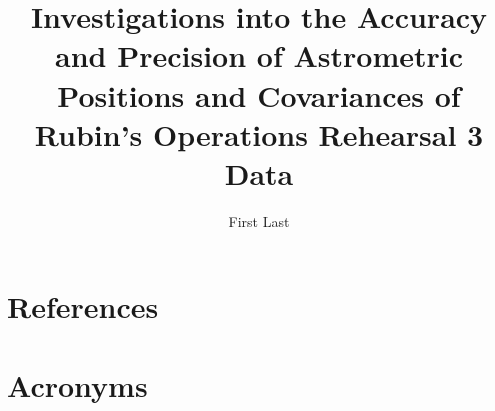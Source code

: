 \documentclass[SE,lsstdraft,authoryear,toc]{lsstdoc}
\title{Investigations into the Accuracy and Precision of Astrometric Positions and Covariances of Rubin's Operations Rehearsal 3 Data}
\author{%
First Last
}
\date{\vcsDate}
\begin{document}
\maketitle


\appendix
\section{References} \label{sec:bib}
\renewcommand{\refname}{} %


\section{Acronyms} \label{sec:acronyms}

\end{document}
